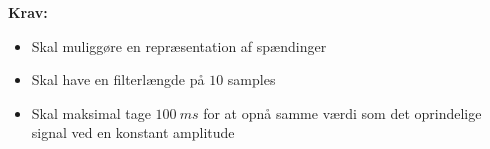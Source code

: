 \vspace{3mm}
\textbf{Krav:}
\begin{itemize}
\item Skal muliggøre en repræsentation af spændinger 
\item Skal have en filterlængde på $10$ samples
\item Skal maksimal tage $100~ms$ for at opnå samme værdi som det oprindelige signal ved en konstant amplitude
\end{itemize}